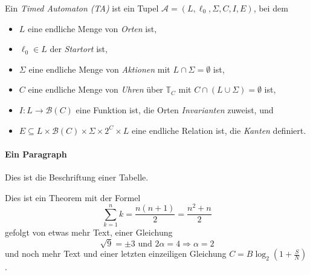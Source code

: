 \begin{definition}\label{def:dummy-def}
Ein \emph{Timed Automaton (TA)} ist ein Tupel $\mathcal{A}=(L,\ell_0,\Sigma,C,I,E)$, bei dem
\begin{itemize}
	\item $L$ eine endliche Menge von \emph{Orten} ist,
	\item $\ell_0\in L$ der \emph{Startort} ist,
	\item $\Sigma$ eine endliche Menge von \emph{Aktionen} mit $L\cap\Sigma=\emptyset$ ist,
	\item $C$ eine endliche Menge von \emph{Uhren} über $\mathbb{T}_C$ mit $C\cap(L\cup\Sigma)=\emptyset$ ist,
	\item $I:L\rightarrow\mathcal{B}(C)$ eine Funktion ist, die Orten \emph{Invarianten} zuweist, und
	\item $E\subseteq L\times\mathcal{B}(C)\times\Sigma\times 2^{C}\times L$ eine endliche Relation ist, die \emph{Kanten} definiert.
\end{itemize}
\end{definition}


\paragraph{Ein Paragraph}
\lipsum[9]

\begin{example}\label{example:dummy-example}
\lipsum[5-6]
\end{example}

\begin{table}[tp]
    \centering
    \caption{Dies ist die Beschriftung einer Tabelle.}\label{table:some-table}
    
\end{table}


\begin{theorem}\label{theorem:dummy-theorem}
Dies ist ein Theorem mit der Formel
\begin{equation}
\label{eq:equation1}
\sum_{k=1}^n k=\frac{n(n+1)}{2}=\frac{n^2+n}{2}
\end{equation}
gefolgt von etwas mehr Text, einer Gleichung
$$\sqrt{9}=\pm3\text{ und }2\alpha=4\Rightarrow\alpha=2$$
und noch mehr Text und einer letzten einzeiligen Gleichung \(C = B \log_2 \left(1 + \frac{S}{N} \right) \).
\end{theorem}

